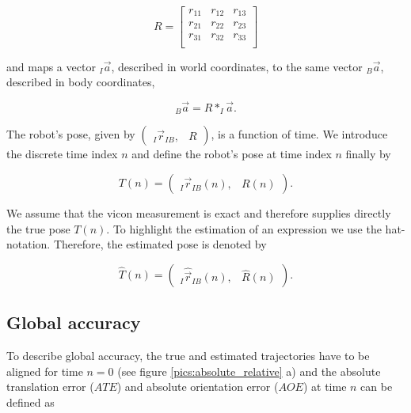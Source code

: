 \begin{equation}
       R = \left[ \begin{array}{ccc}
		r_{11} & r_{12}	& r_{13} \\
		r_{21} & r_{22} 	& r_{23} \\
		r_{31} & r_{32}	& r_{33} \\
		\end{array} \right]
\end{equation}

and maps a vector $_I \vec{a} $, described in world coordinates, to the same vector $_B \vec{a} $, described in body coordinates,

\begin{equation}
	_B \vec{a} = R * _I \vec{a} .
\end{equation}


The robot's pose, given by $ \left( \begin{array}{cc} _I \vec{r}_{IB}, & R \end{array} \right) $, is a function of time. We introduce the discrete time index $n$ and define the robot's pose at time index $n$ finally by 

\begin{equation}
	T(n) = \left( \begin{array}{cc} _I \vec{r}_{IB}(n), & R(n) \end{array} \right) .
\end{equation}

We assume that the vicon measurement is exact and therefore supplies directly the true pose $T(n)$. To highlight the estimation of an expression we use the hat-notation. Therefore, the estimated pose is denoted by

\begin{equation}
	\hat{T}(n) = \left( \begin{array}{cc} _I \hat{\vec{r}}_{IB}(n), & \hat{R}(n) \end{array} \right) .
\end{equation}


\subsection{Global accuracy}
\label{sec:global}

To describe global accuracy, the true and estimated trajectories have to be aligned for time $n=0$ (see figure \ref{pics:absolute_relative} a) and the absolute translation error ($ATE$) and absolute orientation error ($AOE$) at time $n$ can be defined as

